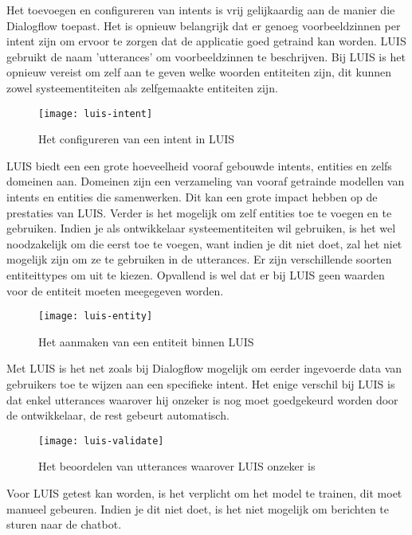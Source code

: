 Het toevoegen en configureren van intents is vrij gelijkaardig aan de manier die Dialogflow toepast. Het is opnieuw belangrijk dat er genoeg voorbeeldzinnen per intent zijn om ervoor te zorgen dat de applicatie goed getraind kan worden. LUIS gebruikt de naam 'utterances' om voorbeeldzinnen te beschrijven. Bij LUIS is het opnieuw vereist om zelf aan te geven welke woorden entiteiten zijn, dit kunnen zowel systeementiteiten als zelfgemaakte entiteiten zijn.

\begin{figure}[H]
    \label{fig:luis-intent}
    \centering
    \texttt{[image: luis-intent]}
    \caption{Het configureren van een intent in LUIS}
\end{figure}

LUIS biedt een een grote hoeveelheid vooraf gebouwde intents, entities en zelfs domeinen aan. Domeinen zijn een verzameling van vooraf getrainde modellen van intents en entities die samenwerken. Dit kan een grote impact hebben op de prestaties van LUIS. Verder is het mogelijk om zelf entities toe te voegen en te gebruiken. Indien je als ontwikkelaar systeementiteiten wil gebruiken, is het wel noodzakelijk om die eerst toe te voegen, want indien je dit niet doet, zal het niet mogelijk zijn om ze te gebruiken in de utterances. Er zijn verschillende soorten entiteittypes om uit te kiezen. Opvallend is wel dat er bij LUIS geen waarden voor de entiteit moeten meegegeven worden.

\begin{figure}[H]
    \label{fig:luis-entity}
    \centering
    \texttt{[image: luis-entity]}
    \caption{Het aanmaken van een entiteit binnen LUIS}
\end{figure}

Met LUIS is het net zoals bij Dialogflow mogelijk om eerder ingevoerde data van gebruikers toe te wijzen aan een specifieke intent. Het enige verschil bij LUIS is dat enkel utterances waarover hij onzeker is nog moet goedgekeurd worden door de ontwikkelaar, de rest gebeurt automatisch.

\begin{figure}[H]
    \label{fig:luis-validate}
    \centering
    \texttt{[image: luis-validate]}
    \caption{Het beoordelen van utterances waarover LUIS onzeker is}
\end{figure}

Voor LUIS getest kan worden, is het verplicht om het model te trainen, dit moet manueel gebeuren. Indien je dit niet doet, is het niet mogelijk om berichten te sturen naar de chatbot.

